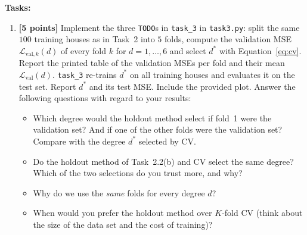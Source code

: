 \documentclass[hidelinks,10pt]{article}
\begin{document}
\textbf{Tasks:}
\begin{enumerate}
    \item \textbf{[5 points]} Implement the three \texttt{TODO}s in \texttt{task\_3} in \texttt{task3.py}: split the same $100$ training houses as in Task~2 into $5$ folds, compute the validation MSE $\mathcal{L}_{\mathrm{val},k}(d)$ of every fold $k$ for $d = 1, \dots, 6$ and select $d^*$ with Equation~\eqref{eq:cv}. Report the printed table of the validation MSEs per fold and their mean $\mathcal{L}_{\mathrm{val}}(d)$. \texttt{task\_3} re-trains $d^*$ on all training houses and evaluates it on the test set. Report $d^*$ and its test MSE. Include the provided plot. Answer the following questions with regard to your results:
    \begin{itemize}
        \item[\textbf{Q3.1}] Which degree would the holdout method select if fold~1 were the validation set? And if one of the other folds were the validation set? Compare with the degree $d^*$ selected by CV.
        \item[\textbf{Q3.2}] Do the holdout method of Task~2.2(b) and CV select the same degree? Which of the two selections do you trust more, and why?
        \item[\textbf{Q3.3}] Why do we use the \emph{same} folds for every degree $d$?
        \item[\textbf{Q3.4}] When would you prefer the holdout method over $K$-fold CV (think about the size of the data set and the cost of training)?
    \end{itemize}
\end{enumerate}
\end{document}

